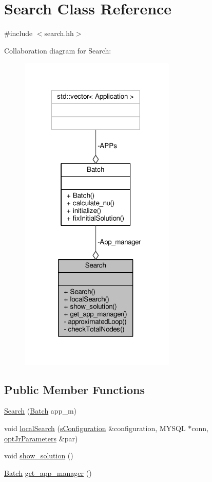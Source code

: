 \hypertarget{classSearch}{\section{Search Class Reference}
\label{classSearch}
}


{\ttfamily \#include $<$search.\-hh$>$}



Collaboration diagram for Search\-:
\nopagebreak
\begin{figure}[H]
\begin{center}
\leavevmode
\includegraphics[width=211pt]{classSearch__coll__graph}
\end{center}
\end{figure}
\subsection*{Public Member Functions}
\begin{DoxyCompactItemize}
\item 
\hyperlink{classSearch_a9fefa80fb3e3cb3b4d81c34e98b53398}{Search} (\hyperlink{classBatch}{Batch} app\-\_\-m)
\item 
void \hyperlink{classSearch_ae5937c445a63dfa24786b5fce04d2b27}{local\-Search} (\hyperlink{readConfigurationFile_8hh_ab8f35b1da3261263c5e9c0e7c8921f5c}{s\-Configuration} \&configuration, M\-Y\-S\-Q\-L $\ast$conn, \hyperlink{classoptJrParameters}{opt\-Jr\-Parameters} \&par)
\item 
void \hyperlink{classSearch_a421161ac4a63ea88eb86832395e32ab5}{show\-\_\-solution} ()
\item 
\hyperlink{classBatch}{Batch} \hyperlink{classSearch_a81ba3ce78974e5b4d46ef2c0804a3477}{get\-\_\-app\-\_\-manager} ()
\end{DoxyCompactItemize}
